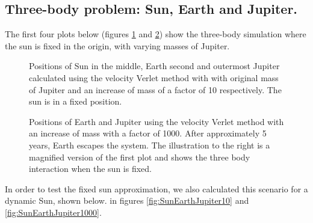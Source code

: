 \documentclass[../main.tex]{subfiles}
\begin{document}
\subsection{Three-body problem: Sun, Earth and Jupiter.}
The first four plots below (figures \ref{fig:SunEarthJupiter10fixed} and \ref{fig:SunEarthJupiter1000fixed}) show the three-body simulation where the sun is fixed in the origin, with varying masses of Jupiter.

\begin{figure}[!h]
  \centering
  \caption{Positions of Sun in the middle, Earth second and outermost Jupiter calculated using the velocity Verlet method with with original mass of Jupiter and an increase of mass of a factor of 10 respectively. The sun is in a fixed position.}
  \label{fig:SunEarthJupiter10fixed}
\end{figure}

\begin{figure}[!h]
  \centering
  \caption{Positions of Earth and Jupiter using the velocity Verlet method with an increase of mass with a factor of 1000. After approximately 5 years, Earth escapes the system. The illustration to the right is a magnified version of the first plot and shows the three body interaction when the sun is fixed.}
  \label{fig:SunEarthJupiter1000fixed}
\end{figure}
\FloatBarrier

In order to test the fixed sun approximation, we also calculated this scenario for a dynamic Sun, shown below. in figures \ref{fig:SunEarthJupiter10} and \ref{fig:SunEarthJupiter1000}.
\end{document}
